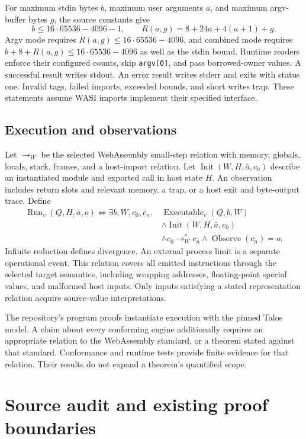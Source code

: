 \documentclass[11pt]{article}
\newcommand{\code}[1]{\texttt{#1}}
\begin{document}
For maximum stdin bytes $b$, maximum user arguments $a$, and maximum argv-buffer bytes $g$, the source constants give
\[
b\le16\cdot65536-4096-1,
\qquad R(a,g)=8+24a+4(a+1)+g.
\]
Argv mode requires $R(a,g)\le16\cdot65536-4096$, and combined mode requires $b+8+R(a,g)\le16\cdot65536-4096$ as well as the stdin bound.  Runtime readers enforce their configured counts, skip \code{argv[0]}, and pass borrowed-owner values.  A successful result writes stdout.  An error result writes stderr and exits with status one.  Invalid tags, failed imports, exceeded bounds, and short writes trap.  These statements assume WASI imports implement their specified interface.

\subsection{Execution and observations}

Let $\longrightarrow_W$ be the selected WebAssembly small-step relation with memory, globals, locals, stack, frames, and a host-import relation.  Let $\operatorname{Init}(W,H,\bar a,c_0)$ describe an instantiated module and exported call in host state $H$.  An observation includes return slots and relevant memory, a trap, or a host exit and byte-output trace.  Define
\begin{align*}
\operatorname{Run}_v(Q,H,\bar a,o)\iff\exists b,W,c_0,c_n.\;&
\operatorname{Executable}_v(Q,b,W)\\
&\land\operatorname{Init}(W,H,\bar a,c_0)\\
&\land c_0\longrightarrow_W^*c_n
\land\operatorname{Observe}(c_n)=o.
\end{align*}
Infinite reduction defines divergence.  An external process limit is a separate operational event.  This relation covers all emitted instructions through the selected target semantics, including wrapping addresses, floating-point special values, and malformed host inputs.  Only inputs satisfying a stated representation relation acquire source-value interpretations.

The repository's program proofs instantiate execution with the pinned Talos model.  A claim about every conforming engine additionally requires an appropriate relation to the WebAssembly standard, or a theorem stated against that standard.  Conformance and runtime tests provide finite evidence for that relation.  Their results do not expand a theorem's quantified scope.

\section{Source audit and existing proof boundaries}
\label{sec:audit}
\end{document}
